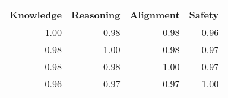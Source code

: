 \begin{tabular}{rrrr}
\toprule
Knowledge & Reasoning & Alignment & Safety \\
\midrule
1.00 & 0.98 & 0.98 & 0.96 \\
0.98 & 1.00 & 0.98 & 0.97 \\
0.98 & 0.98 & 1.00 & 0.97 \\
0.96 & 0.97 & 0.97 & 1.00 \\
\bottomrule
\end{tabular}
